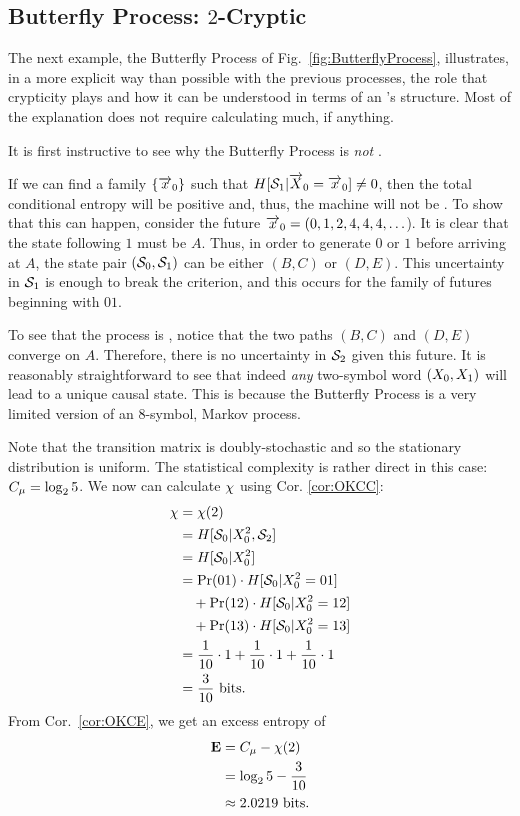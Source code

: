 \subsection{Butterfly Process: $2$-Cryptic}

The next example, the Butterfly Process of Fig.~\ref{fig:ButterflyProcess},
illustrates, in a more explicit way
than possible with the previous processes, the role that crypticity plays and
how it can be understood in terms of an \eM's structure. Most of the
explanation does not require calculating much, if anything.

It is first instructive to see why the Butterfly Process is \emph{not}
. 

If we can find a family $\{ \smash{\overrightarrow{{x}}}_0 \}$ such that
$H[\mathcal{S}_1 | \smash{\overrightarrow{{X}}}_0 = \smash{\overrightarrow{{x}}}_0] \neq 0$, then the total conditional
entropy will be positive and, thus, the machine will not be . To
show that this can happen, consider the future
$\smash{\overrightarrow{{x}}}_0 = (0,1,2,4,4,4,\ldots$). It is clear that the
state following $1$ must be $A$. Thus, in order to generate $0$ or $1$ before
arriving at $A$, the state pair $(\mathcal{S}_0, \mathcal{S}_1)$ can be
either $(B,C)$ or $(D,E)$. This uncertainty in $\mathcal{S}_1$ is enough
to break the criterion, and this occurs for the family of futures beginning with
$01$.

To see that the process is , notice that the two paths $(B,C)$
and $(D, E)$ converge on $A$. Therefore, there is no uncertainty in
$\mathcal{S}_2$ given this future. It is reasonably straightforward to see
that indeed \emph{any} two-symbol word $({X}_0, {X}_1)$ will 
lead to a unique causal state. This is because the Butterfly Process is a very 
limited version of an $8$-symbol,  Markov process.

Note that the transition matrix is doubly-stochastic and so the stationary
distribution is uniform. The statistical complexity is rather direct in this
case: $C_\mu = \log_2 5$. We now can calculate $\chi$ using Cor. \ref{cor:OKCC}:
\begin{align*}
\chi & = \chi(2)\\
    & = H[\mathcal{S}_0 | {X}_0^2, \mathcal{S}_2]\\
    & = H[\mathcal{S}_0 | {X}_0^2]\\
    & = \Pr(01) \cdot H[\mathcal{S}_0 | {X}_0^2 = 01] \\ 
    & ~~~ + \Pr(12) \cdot H[\mathcal{S}_0 | {X}_0^2 = 12] \\
	& ~~~ + \Pr(13) \cdot H[\mathcal{S}_0 | {X}_0^2 = 13]\\
    & = \frac{1}{10} \cdot 1 + \frac{1}{10} \cdot 1 + \frac{1}{10} \cdot 1 \\
    & = \frac{3}{10} ~\mathrm{bits}.
\end{align*}
From Cor.~\ref{cor:OKCE}, we get an excess entropy of
\begin{align*}
{\bf E} & = C_\mu - \chi(2) \\
    & = \log_2 5 - \frac{3}{10} \\
	& \approx 2.0219~\mathrm{bits}.
\end{align*}

